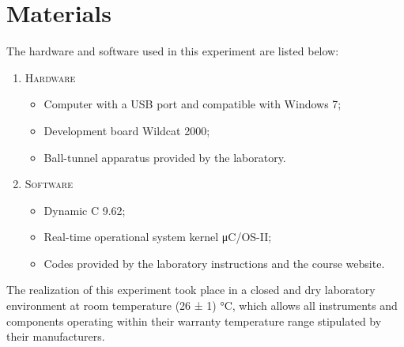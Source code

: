 \section{Materials}

The hardware and software used in this experiment are listed below:

\begin{enumerate}[]
\item \textsc{Hardware}
\begin{itemize}[label={--}]
\item Computer with a USB port and compatible with Windows 7;
\item Development board Wildcat 2000;
\item Ball-tunnel apparatus provided by the laboratory.
\end{itemize}

\item \textsc{Software}
\begin{itemize}[label={--}]
\item Dynamic C 9.62;
\item Real-time operational system kernel μC/OS-II;
\item Codes provided by the laboratory instructions and the course website.
\end{itemize}
\end{enumerate}

The realization of this experiment took place in a closed and dry laboratory environment at room temperature (26 ± 1) °C, which allows all instruments and components operating within their warranty temperature range stipulated by their manufacturers.
